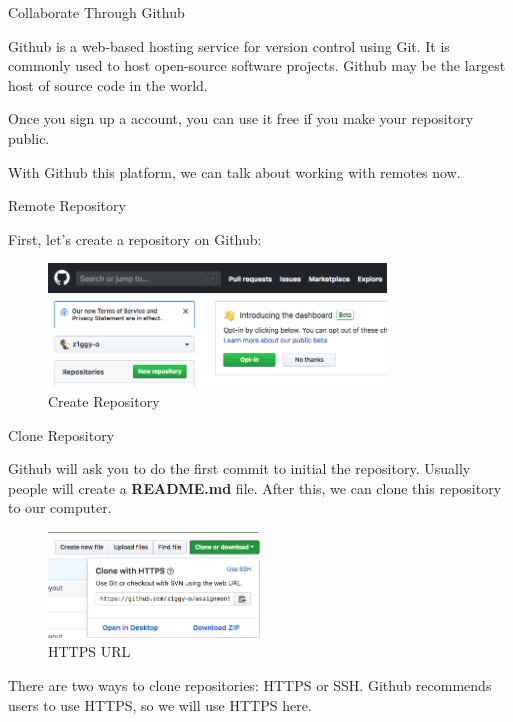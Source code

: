 \documentclass[10pt, a4papaer]{article}
\begin{document}
\begin{section}{Collaborate Through Github}

Github is a web-based hosting service for version control using Git. It is
commonly used to host open-source software projects. Github may be the largest
host of source code in the world.

Once you sign up a account, you can use it free if you make your repository
public.

With Github this platform, we can talk about working with remotes now.

\begin{subsection}{Remote Repository}

First, let's create a repository on Github:

\begin{figure}[h]
    \centering
    \includegraphics[width=0.8\textwidth]{images/create-repo}
    \caption{Create Repository}
\end{figure}

\begin{subsubsection}{Clone Repository}
    
Github will ask you to do the first commit to initial the repository. Usually
people will create a \textbf{README.md} file. After this, we can clone this 
repository to our computer.

\begin{figure}[h]
    \centering
    \includegraphics[width=0.5\textwidth]{images/clone-button}
    \caption{HTTPS URL}
\end{figure}

There are two ways to clone repositories: HTTPS or SSH. Github recommends users
to use HTTPS, so we will use HTTPS here.


\end{subsubsection}
\end{subsection}
\end{section}
\end{document}
